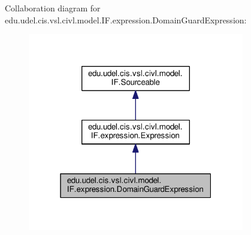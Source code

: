 Collaboration diagram for edu.\+udel.\+cis.\+vsl.\+civl.\+model.\+I\+F.\+expression.\+Domain\+Guard\+Expression\+:
\nopagebreak
\begin{figure}[H]
\begin{center}
\leavevmode
\includegraphics[width=268pt]{interfaceedu_1_1udel_1_1cis_1_1vsl_1_1civl_1_1model_1_1IF_1_1expression_1_1DomainGuardExpression__coll__graph}
\end{center}
\end{figure}
